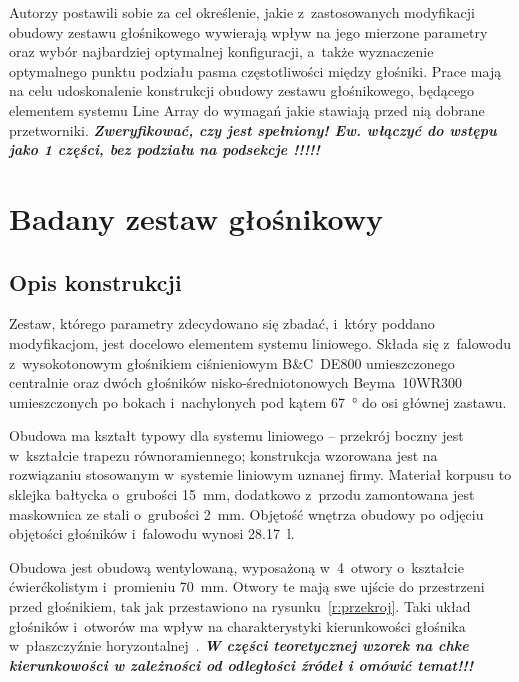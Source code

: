 \documentclass[12pt]{oska}
\newcommand{\comment}[1]{{\color{magenta}\emph{\textbf{#1}}}}
\begin{document}
		Autorzy postawili sobie za cel określenie, jakie z~zastosowanych modyfikacji obudowy zestawu głośnikowego wywierają wpływ na jego mierzone parametry oraz wybór najbardziej optymalnej konfiguracji, a~także wyznaczenie optymalnego punktu podziału pasma częstotliwości między głośniki.  Prace mają na celu udoskonalenie konstrukcji obudowy zestawu głośnikowego, będącego elementem systemu Line Array do wymagań jakie stawiają przed nią dobrane przetworniki. \comment{Zweryfikować, czy jest spełniony! Ew. włączyć do wstępu jako 1 części, bez podziału na podsekcje !!!!!}

\section{Badany zestaw głośnikowy}

	\subsection{Opis konstrukcji}\label{ss:opis}
	
		Zestaw, którego parametry zdecydowano się zbadać, i~który poddano modyfikacjom, jest docelowo elementem systemu liniowego. Składa się z~falowodu z~wysokotonowym głośnikiem ciśnieniowym B\&C~DE800 umieszczonego centralnie oraz dwóch głośników nisko-średniotonowych Beyma~10WR300 umieszczonych po bokach i~nachylonych pod kątem \SI{67}{\degree} do osi głównej zastawu. 
		
		Obudowa ma kształt typowy dla systemu liniowego -- przekrój boczny jest w~kształcie trapezu równoramiennego; konstrukcja wzorowana jest na rozwiązaniu stosowanym w~systemie liniowym uznanej firmy. Materiał korpusu to sklejka bałtycka o~grubości \SI{15}{\milli\metre}, dodatkowo z~przodu zamontowana jest maskownica ze stali o~grubości \SI{2}{\milli\metre}. Objętość wnętrza obudowy po odjęciu objętości głośników i~falowodu wynosi \SI{28,17}{\litre}.
		
		Obudowa jest obudową wentylowaną, wyposażoną w~4~otwory o~kształcie ćwierćkolistym i~promieniu \SI{70}{\milli\metre}. Otwory te mają swe ujście do przestrzeni przed głośnikiem, tak jak przestawiono na rysunku~\ref{r:przekroj}. %
		Taki układ głośników i~otworów ma wpływ na charakterystyki kierunkowości głośnika w~płaszczyźnie horyzontalnej~\cite{kmiecik_inz}. \comment{W części teoretycznej wzorek na chke kierunkowości w zależności od odległości źródeł i omówić temat!!!}
		
\end{document}
